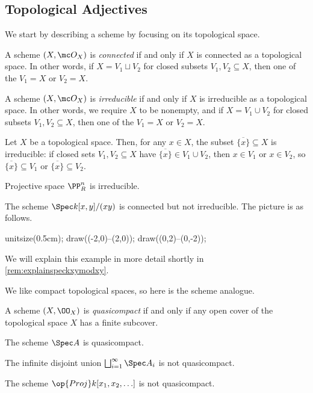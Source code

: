 \documentclass[../notes.tex]{subfiles}
\begin{document}
\subsection{Topological Adjectives}
We start by describing a scheme by focusing on its topological space.
\begin{definition}[Connected]
	A scheme $(X,\mc O_X)$ is \textit{connected} if and only if $X$ is connected as a topological space. In other words, if $X=V_1\sqcup V_2$ for closed subsets $V_1,V_2\subseteq X$, then one of the $V_1=X$ or $V_2=X$.
\end{definition}
\begin{definition}[Irreducible]
	A scheme $(X,\mc O_X)$ is \textit{irreducible} if and only if $X$ is irreducible as a topological space. In other words, we require $X$ to be nonempty, and if $X=V_1\cup V_2$ for closed subsets $V_1,V_2\subseteq X$, then one of the $V_1=X$ or $V_2=X$.
\end{definition}
\begin{example} \label{ex:closurepoint}
	Let $X$ be a topological space. Then, for any $x\in X$, the subset $\overline{\{x\}}\subseteq X$ is irreducible: if closed sets $V_1,V_2\subseteq X$ have $\overline{\{x\}}\in V_1\cup V_2$, then $x\in V_1$ or $x\in V_2$, so $\overline{\{x\}}\subseteq V_1$ or $\overline{\{x\}}\subseteq V_2$.
\end{example}
\begin{example}
	Projective space $\PP^n_R$ is irreducible.
\end{example}
\begin{nex} \label{nex:speckxymodxy}
	The scheme $\Spec k[x,y]/(xy)$ is connected but not irreducible. The picture is as follows.
	\begin{center}
		\begin{asy}
			unitsize(0.5cm);
			draw((-2,0)--(2,0));
			draw((0,2)--(0,-2));
		\end{asy}
	\end{center}
	We will explain this example in more detail shortly in \autoref{rem:explainspeckxymodxy}.
\end{nex}
We like compact topological spaces, so here is the scheme analogue.
\begin{definition}[Quasicompact]
	A scheme $(X,\OO_X)$ is \textit{quasicompact} if and only if any open cover of the topological space $X$ has a finite subcover.
\end{definition}
\begin{example}
	The scheme $\Spec A$ is quasicompact.
\end{example}
\begin{nex}
	The infinite disjoint union $\bigsqcup_{i=1}^\infty\Spec A_i$ is not quasicompact.
\end{nex}
\begin{nex}
	The scheme $\op{Proj}k[x_1,x_2,\ldots]$ is not quasicompact.
\end{nex}
\end{document}
